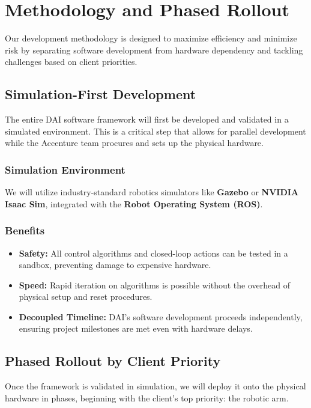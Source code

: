\chapter{Methodology and Phased Rollout}
\label{chap:methodology}

Our development methodology is designed to maximize efficiency and minimize risk by separating software development from hardware dependency and tackling challenges based on client priorities.

\section{Simulation-First Development}
The entire DAI software framework will first be developed and validated in a simulated environment. This is a critical step that allows for parallel development while the Accenture team procures and sets up the physical hardware.

\subsection{Simulation Environment}
We will utilize industry-standard robotics simulators like \textbf{Gazebo} or \textbf{NVIDIA Isaac Sim}, integrated with the \textbf{Robot Operating System (ROS)}.

\subsection{Benefits}
\begin{itemize}
    \item \textbf{Safety:} All control algorithms and closed-loop actions can be tested in a sandbox, preventing damage to expensive hardware.
    \item \textbf{Speed:} Rapid iteration on algorithms is possible without the overhead of physical setup and reset procedures.
    \item \textbf{Decoupled Timeline:} DAI's software development proceeds independently, ensuring project milestones are met even with hardware delays.
\end{itemize}

\section{Phased Rollout by Client Priority}
Once the framework is validated in simulation, we will deploy it onto the physical hardware in phases, beginning with the client's top priority: the robotic arm.

